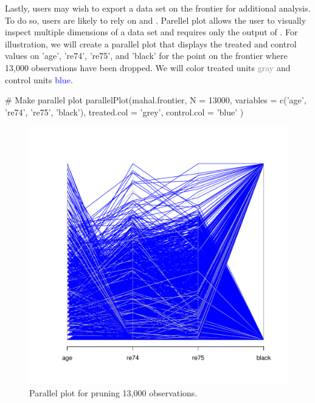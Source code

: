 \documentclass[nojss]{jss}
\begin{document}
Lastly, users may wish to export a data set on the frontier for
additional analysis. To do so, users are likely to rely on
 and . Parellel plot
allows the user to visually inspect multiple dimensions of a data set
and requires only the output of . For
illustration, we will create a parallel plot that displays 
the treated and control values on 'age', 're74', 're75', and
'black' for the point on the frontier where 13,000 observations
have been dropped. We will color treated units \textcolor{gray}{gray}
and control units \textcolor{blue}{blue}.

\begin{minipage}{0.45\textwidth}
\begin{CodeChunk}
\begin{CodeInput}
# Make parallel plot
parallelPlot(mahal.frontier,
             N = 13000,
             variables = c('age',
             're74',
             're75',
             'black'),
             treated.col = 'grey',
             control.col = 'blue'
             )
\end{CodeInput}
\end{CodeChunk}
\end{minipage}
\begin{minipage}{0.5\textwidth}
\begin{figure}[H]
\includegraphics{mahal_parplot.pdf}
\caption{\label{fig:mahal_parplot} Parallel plot for pruning 13,000 observations.}
\end{figure}
\end{minipage} \hfill
\newline
\newline
\end{document}
